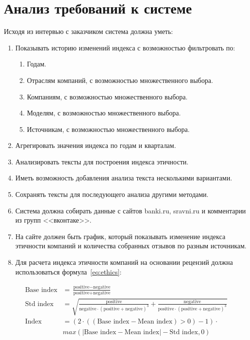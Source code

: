 \documentclass{article}
\begin{document}
\section{Анализ требований к системе}
\label{sec:orgff14b7d}
Исходя из интервью с заказчиком система должна уметь:
\begin{enumerate}
\item Показывать историю изменений индекса с возможностью фильтровать по:
\begin{enumerate}
\item Годам.
\item Отраслям компаний, с возможностью множественного выбора.
\item Компаниям, с возможностью множественного выбора.
\item Моделям, с возможностью множественного выбора.
\item Источникам, с возможностью множественного выбора.
\end{enumerate}
\item Агрегировать значения индекса по годам и кварталам.
\item Анализировать тексты для построения индекса этичности.
\item Иметь возможность добавления анализа текста несколькими вариантами.
\item Сохранять тексты для последующего анализа другими методами.
\item Система должна собирать данные с сайтов banki.ru, sravni.ru и комментарии из групп {}<<вконтаке>>{}.
\item На сайте должен быть график, который показывать изменение индекса этичности компаний и количества собранных отзывов по разным источникам.
\item Для расчета индекса этичности компаний на основании рецензий должна использоваться формула~\ref{eq:ethics}:
\end{enumerate}

\begin{equation}
\label{eq:ethics}
\begin{aligned}
\text{Base index} &= \frac{\text{positive} - \text{negative}}{\text{positive} + \text{negative}} \\
\text{Std index} &= \sqrt{\frac{\text{positive}}{\text{negative} \cdot (\text{positive} + \text{negative})^{3}} + \frac{\text{negative}}{\text{positive} \cdot (\text{positive} + \text{negative})^{3}}} \\
\text{Index} &= ({2\cdot(({\text{Base index}}-{\text{Mean index}}) > 0) - 1})\cdot\\
            &{max\left(\left|{\text{Base index}}-{\text{Mean index}}\right|-{\text{Std index}}, 0\right)}
\end{aligned}
\end{equation}
\end{document}
